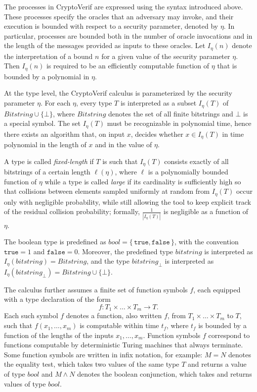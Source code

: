 The processes in CryptoVerif are expressed using the syntax introduced above. These processes specify the oracles that an adversary may invoke, and their execution is bounded with respect to a security parameter, denoted by $\eta$. In particular, processes are bounded both in the number of oracle invocations and in the length of the messages provided as inputs to these oracles. Let $I_\eta(n)$ denote the interpretation of a bound $n$ for a given value of the security parameter $\eta$. Then $I_\eta(n)$ is required to be an efficiently computable function of $\eta$ that is bounded by a polynomial in $\eta$.

At the type level, the CryptoVerif calculus is parameterized by the security parameter $\eta$. For each $\eta$, every type $T$ is interpreted as a subset $I_\eta(T)$ of $Bitstring \cup \{\bot\}$, where $Bitstring$ denotes the set of all finite bitstrings and $\bot$ is a special symbol. The set $I_\eta(T)$ must be recognizable in polynomial time, hence there exists an algorithm that, on input $x$, decides whether $x \in I_\eta(T)$ in time polynomial in the length of $x$ and in the value of $\eta$.

A type is called \textit{fixed-length} if $T$ is such that $I_\eta(T)$ consists exactly of all bitstrings of a certain length $\ell(\eta)$, where $\ell$ is a polynomially bounded function of $\eta$ while a type is called \textit{large} if its cardinality is sufficiently high so that collisions between elements sampled uniformly at random from $I_\eta(T)$ occur only with negligible probability, while still allowing the tool to keep explicit track of the residual collision probability; formally, $\frac{1}{|I_\eta(T)|}$ is negligible as a function of $\eta$.

The boolean type is predefined as $\mathit{bool} = \{\,\mathtt{true}, \mathtt{false}\,\}$, with the convention $\mathtt{true} = 1$ and $\mathtt{false} = 0$. Moreover, the predefined type $bitstring$ is interpreted as $I_\eta(bitstring) = Bitstring$, and the type $bitstring_\bot$ is interpreted as $I_\eta(bitstring_\bot) = Bitstring \cup \{\bot\}$.

The calculus further assumes a finite set of function symbols $f$, each equipped with a type declaration of the form
\[
f : T_1 \times \dots \times T_m \to T.
\]
Each such symbol $f$ denotes a function, also written $f$, from $T_1 \times \dots \times T_m$ to $T$, such that $f(x_1, \dots, x_m)$ is computable within time $t_f$, where $t_f$ is bounded by a function of the lengths of the inputs $x_1, \dots, x_m$. Function symbols $f$ correspond to functions computable by deterministic Turing machines that always terminate. Some function symbols are written in infix notation, for example: $M = N$ denotes the equality test, which takes two values of the same type $T$ and returns a value of type $bool$ and $M \land N$ denotes the boolean conjunction, which takes and returns values of type $bool$.

